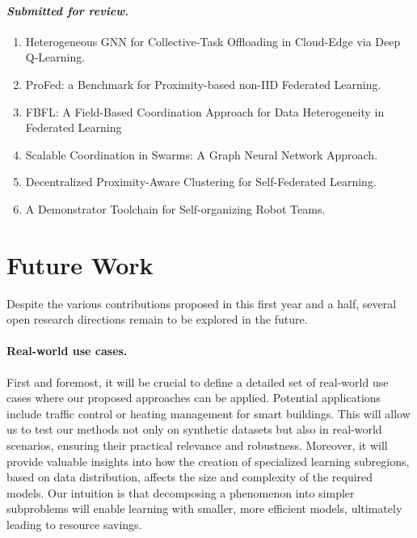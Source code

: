 \documentclass[12pt]{article}
\begin{document}
 \sloppypar
 \paragraph{\emph{Submitted for review.}}
 \begin{enumerate}
	 \item Heterogeneous GNN for Collective-Task Offloading in Cloud-Edge via Deep
	  Q-Learning.~\cite{DBLP:journals/taas/FarabegoliDAV2025}
	 \item ProFed: a Benchmark for Proximity-based non-IID Federated Learning.~\cite{DBLP:conf/ijcnn/DominiAV2025}
	 \item FBFL: A Field-Based Coordination Approach for Data Heterogeneity in 
	  Federated Learning~\cite{domini2025fbflfieldbasedcoordinationapproach}
	 \item Scalable Coordination in Swarms: A Graph Neural Network Approach.~\cite{DBLP:conf/coordination/VenturiniDAV2025}
	 \item Decentralized Proximity-Aware Clustering for Self-Federated Learning.~\cite{DBLP:journals/iot/DominiAFVE2025}
	 \item A Demonstrator Toolchain for Self-organizing Robot Teams.~\cite{DBLP:conf/coordination/AguzziNDR25} 
 \end{enumerate}

\section{Future Work}\label{sec:future}

Despite the various contributions proposed in this first year and a half, several open research directions
 remain to be explored in the future.

\paragraph{Real-world use cases.}

First and foremost, it will be crucial to define a detailed set of real-world use cases where our proposed approaches can be applied. 
%
Potential applications include traffic control or heating management for smart buildings. 
%
This will allow us to test our methods not only on synthetic datasets but also in real-world scenarios, 
 ensuring their practical relevance and robustness. 
% 
Moreover, it will provide valuable insights into how the creation of specialized learning subregions, based on data distribution, 
 affects the size and complexity of the required models. 
% 
Our intuition is that decomposing a phenomenon into simpler subproblems will enable learning with smaller, more efficient models, 
 ultimately leading to resource savings.
\end{document}
